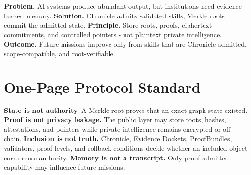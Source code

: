 \documentclass[11pt,letterpaper]{article}
\begin{document}
\begin{abstract}
The Validated Skill Graph is a proof-carrying memory substrate for autonomous AI work: candidate output becomes reusable capability only after Proof Debt is retired, AGI Jobs return evidence, an Evidence Docket aggregates proof, and Chronicle admits a scoped skill. This paper argues that Merkle roots are the natural commitment primitive for that graph. A Merkle-native Validated Skill Graph represents skills, graph edges, Evidence Dockets, ProofBundles, policies, attestations, revocations, supersessions, encrypted capsule references, and metadata as domain-separated leaves. It derives typed subroots and binds them into a single graph epoch root. The root can be committed on-chain while private intelligence remains encrypted, off-chain, or zero-knowledge-proven. The result is a compact, tamper-evident, inclusion-verifiable substrate for reusable capability. We formalize canonicalization, domain separation, root construction, inclusion proofs, root continuity, Chronicle gating, direct-agent authorization, privacy boundaries, zero-knowledge compatibility, threat models, conformance levels, and evaluation tests. The central claim is architectural and falsifiable: durable capability memory should not be a transcript, prompt library, or mutable database; it should be a proof-gated graph whose admitted state is committed by cryptographic roots and whose private contents remain protected.
\end{abstract}

\begin{lawbox}
\textbf{Problem.} AI systems produce abundant output, but institutions need evidence-backed memory. \textbf{Solution.} Chronicle admits validated skills; Merkle roots commit the admitted state. \textbf{Principle.} Store roots, proofs, ciphertext commitments, and controlled pointers - not plaintext private intelligence. \textbf{Outcome.} Future missions improve only from skills that are Chronicle-admitted, scope-compatible, and root-verifiable.
\end{lawbox}


\section{One-Page Protocol Standard}
\begin{lawbox}
\textbf{State is not authority.} A Merkle root proves that an exact graph state existed. \textbf{Proof is not privacy leakage.} The public layer may store roots, hashes, attestations, and pointers while private intelligence remains encrypted or off-chain. \textbf{Inclusion is not truth.} Chronicle, Evidence Dockets, ProofBundles, validators, proof levels, and rollback conditions decide whether an included object earns reuse authority. \textbf{Memory is not a transcript.} Only proof-admitted capability may influence future missions.
\end{lawbox}
\end{document}
